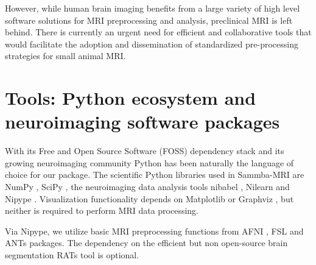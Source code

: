 \documentclass[utf8, a4paper, final, crop]{frontiersSCNS}
\begin{document}
However, while human brain imaging benefits from a large variety of high 
level software solutions 
for MRI preprocessing and analysis, preclinical MRI
is left behind.
There is currently an urgent need for %
efficient and collaborative tools that would facilitate the adoption and 
dissemination of standardized pre-processing strategies for small animal MRI.

%
%

\section{Tools: Python ecosystem and neuroimaging software packages}

With its Free and Open Source Software (FOSS)
dependency stack and its growing neuroimaging community 
Python has been naturally the language of choice for our
package.
%
%
%
The scientific Python libraries used in Sammba-MRI are
NumPy \citep{oliphant2006guide}, SciPy \citep{millman2011python}, the neuroimaging 
data analysis tools nibabel \citep{nibabel}, Nilearn \citep{abraham2014machine} and 
Nipype \citep{gorgolewski2011Nipype}. %
Visualization functionality depends on Matplotlib \citep{hunter2007matplotlib} 
or Graphviz \citep{gansner2000open}, but neither is required to perform
MRI data processing.

Via Nipype, we utilize basic MRI preprocessing
functions from AFNI \citep{cox1996afni}, FSL \citep{jenkinson2012fsl} and ANTs 
\citep{avants2009advanced}
packages. The dependency on the efficient but non open-source brain segmentation RATs 
tool \citep{oguz2014rats} is optional.
\end{document}
